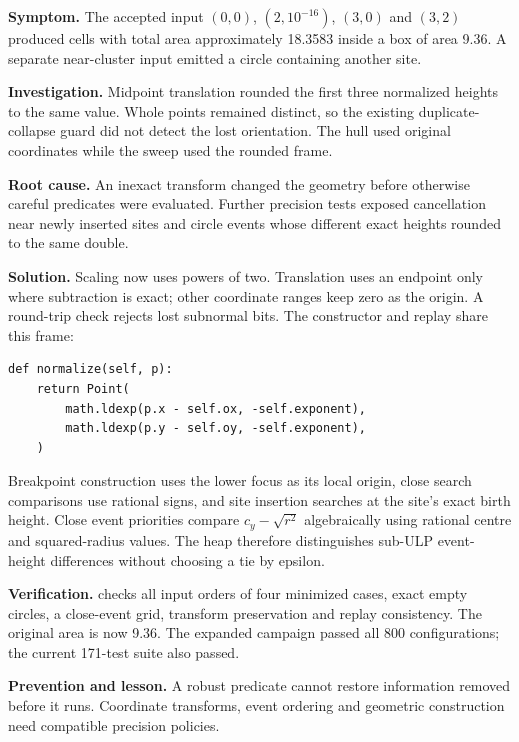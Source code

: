 \textbf{Symptom.} The accepted input $(0,0)$, $(2,10^{-16})$, $(3,0)$ and $(3,2)$ produced cells with total area approximately 18.3583 inside a box of area 9.36. A separate near-cluster input emitted a circle containing another site.

\textbf{Investigation.} Midpoint translation rounded the first three normalized heights to the same value. Whole points remained distinct, so the existing duplicate-collapse guard did not detect the lost orientation. The hull used original coordinates while the sweep used the rounded frame.

\textbf{Root cause.} An inexact transform changed the geometry before otherwise careful predicates were evaluated. Further precision tests exposed cancellation near newly inserted sites and circle events whose different exact heights rounded to the same double.

\textbf{Solution.} Scaling now uses powers of two. Translation uses an endpoint only where subtraction is exact; other coordinate ranges keep zero as the origin. A round-trip check rejects lost subnormal bits. The constructor and replay share this frame:

\begin{lstlisting}[caption={Normalize with an exact power-of-two scale.},label={lst:frame-fix}]
def normalize(self, p):
    return Point(
        math.ldexp(p.x - self.ox, -self.exponent),
        math.ldexp(p.y - self.oy, -self.exponent),
    )
\end{lstlisting}

Breakpoint construction uses the lower focus as its local origin, close search comparisons use rational signs, and site insertion searches at the site's exact birth height. Close event priorities compare $c_y-\sqrt{r^2}$ algebraically using rational centre and squared-radius values. The heap therefore distinguishes sub-ULP event-height differences without choosing a tie by epsilon.

\textbf{Verification.}  checks all input orders of four minimized cases, exact empty circles, a close-event grid, transform preservation and replay consistency. The original area is now 9.36. The expanded campaign passed all 800 configurations; the current 171-test suite also passed.

\textbf{Prevention and lesson.} A robust predicate cannot restore information removed before it runs. Coordinate transforms, event ordering and geometric construction need compatible precision policies.

